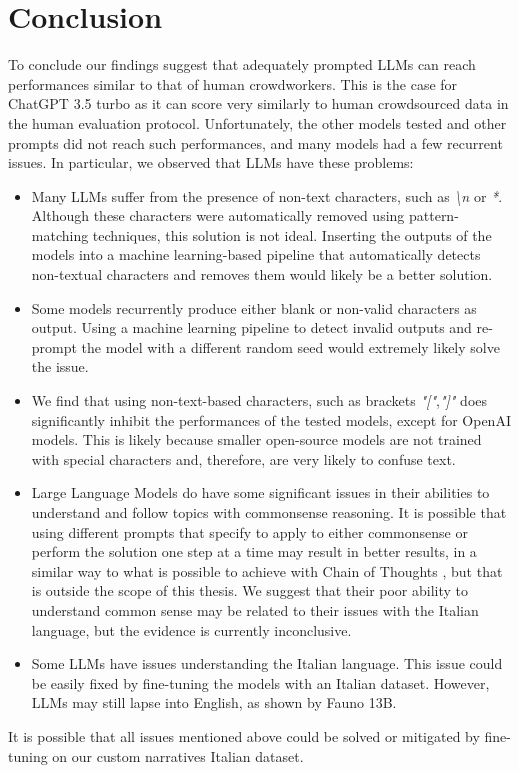 \chapter{Conclusion}
\label{cha:conclusion}
To conclude our findings suggest that adequately prompted LLMs can reach performances similar to that of human crowdworkers. This is the case for ChatGPT 3.5 turbo as it can score very similarly to human crowdsourced data in the human evaluation protocol.
Unfortunately, the other models tested and other prompts did not reach such performances, and many models had a few recurrent issues. In particular, we observed that LLMs have these problems:
\begin{itemize}
    \item Many LLMs suffer from the presence of non-text characters, such as \emph{\textbackslash n} or \emph{*}. Although these characters were automatically removed using pattern-matching techniques, this solution is not ideal. Inserting the outputs of the models into a machine learning-based pipeline that automatically detects non-textual characters and removes them would likely be a better solution.
    \item Some models recurrently produce either blank or non-valid characters as output. Using a machine learning pipeline to detect invalid outputs and re-prompt the model with a different random seed would extremely likely solve the issue.
    \item We find that using non-text-based characters, such as brackets \emph{"["},\emph{"]"} does significantly inhibit the performances of the tested models, except for OpenAI models. This is likely because smaller open-source models are not trained with special characters and, therefore, are very likely to confuse text.
    \item Large Language Models do have some significant issues in their abilities to understand and follow topics with commonsense reasoning. It is possible that using different prompts that specify to apply to either commonsense or perform the solution one step at a time may result in better results, in a similar way to what is possible to achieve with Chain of Thoughts \cite{wei2023chainofthought}, but that is outside the scope of this thesis. We suggest that their poor ability to understand common sense may be related to their issues with the Italian language, but the evidence is currently inconclusive.
    \item Some LLMs have issues understanding the Italian language. This issue could be easily fixed by fine-tuning the models with an Italian dataset. However, LLMs may still lapse into English, as shown by Fauno 13B.
\end{itemize}
It is possible that all issues mentioned above could be solved or mitigated by fine-tuning on our custom narratives Italian dataset.

